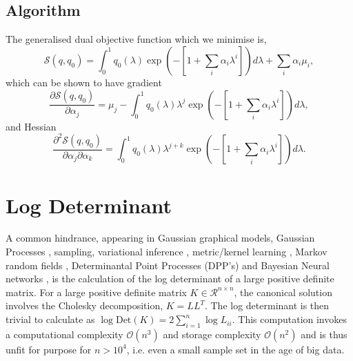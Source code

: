 \documentclass[letterpaper]{article} %
\begin{document}
\subsection{Algorithm}
\label{algorithm}
The generalised dual objective function which we minimise is,
\begin{equation}
\mathcal{S}(q,q_{0}) = \int_{0}^{1}q_{0}(\lambda)\exp(-[1+\sum_{i}\alpha_{i}\lambda^{i}])d\lambda + \sum_{i}\alpha_{i}\mu_{i},
\end{equation}
which can be shown to have gradient
\begin{equation}
\frac{\partial \mathcal{S}(q,q_{0})}{\partial \alpha_{j}}= \mu_{j}-\int_{0}^{1}q_{0}(\lambda)\lambda^{j}\exp(-[1+\sum_{i}\alpha_{i}\lambda^{i}])d\lambda,
\end{equation}
and Hessian
\begin{equation}
\frac{\partial^{2} \mathcal{S}(q,q_{0})}{\partial \alpha_{j}\partial\alpha_{k}}= \int_{0}^{1}q_{0}(\lambda)\lambda^{j+k}\exp(-[1+\sum_{i}\alpha_{i}\lambda^{i}])d\lambda.
\end{equation}
\section{Log Determinant}
A common hindrance, appearing in Gaussian graphical models, Gaussian Processes \cite{rue2005gaussian,rasmussen2006gaussian}, sampling, variational inference \cite{mackay2003information}, metric/kernel learning \cite{davis2007information,van2009minimum}, Markov random fields \cite{wainwright2006log}, Determinantal Point Processes (DPP's) and Bayesian Neural networks \cite{mackay1992bayesian}, is the calculation of the log determinant of a large positive definite matrix. For a large positive definite matrix $K \in  \mathcal{R}^{n\times n}$, the canonical solution involves the Cholesky decomposition, $K = LL^{T}$. The log determinant is then trivial to calculate as $\log \mathrm{Det}(K) = 2\sum_{i=1}^{n}\log L_{ii}$. This computation invokes a computational complexity $\mathcal{O}(n^{3})$ and storage complexity $\mathcal{O}(n^{2})$ and is thus unfit for purpose for $n>10^{4}$, i.e. even a small sample set in the age of big data. 
\end{document}
